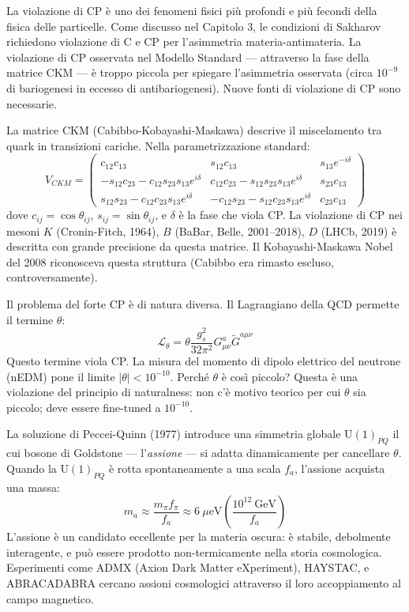 \documentclass[11.5pt,a4paper,openany]{book}
\theoremstyle{remark}
\begin{document}
La violazione di CP è uno dei fenomeni fisici più profondi e più fecondi della fisica delle particelle. Come discusso nel Capitolo 3, le condizioni di Sakharov richiedono violazione di C e CP per l'asimmetria materia-antimateria. La violazione di CP osservata nel Modello Standard --- attraverso la fase della matrice CKM --- è troppo piccola per spiegare l'asimmetria osservata (circa $10^{-9}$ di bariogenesi in eccesso di antibariogenesi). Nuove fonti di violazione di CP sono necessarie.

La matrice CKM (Cabibbo-Kobayashi-Maskawa) descrive il miscelamento tra quark in transizioni cariche. Nella parametrizzazione standard:
\[
V_{CKM} = \begin{pmatrix} c_{12}c_{13} & s_{12}c_{13} & s_{13}e^{-i\delta} \\ -s_{12}c_{23}-c_{12}s_{23}s_{13}e^{i\delta} & c_{12}c_{23}-s_{12}s_{23}s_{13}e^{i\delta} & s_{23}c_{13} \\ s_{12}s_{23}-c_{12}c_{23}s_{13}e^{i\delta} & -c_{12}s_{23}-s_{12}c_{23}s_{13}e^{i\delta} & c_{23}c_{13} \end{pmatrix}
\]
dove $c_{ij} = \cos\theta_{ij}$, $s_{ij} = \sin\theta_{ij}$, e $\delta$ è la fase che viola CP. La violazione di CP nei mesoni $K$ (Cronin-Fitch, 1964), $B$ (BaBar, Belle, 2001--2018), $D$ (LHCb, 2019) è descritta con grande precisione da questa matrice. Il Kobayashi-Maskawa Nobel del 2008 riconosceva questa struttura (Cabibbo era rimasto escluso, controversamente).

Il problema del forte CP è di natura diversa. Il Lagrangiano della QCD permette il termine $\theta$:
\[
\mathcal{L}_\theta = \theta \frac{g_s^2}{32\pi^2} G_{\mu\nu}^a \tilde{G}^{a\mu\nu}
\]
Questo termine viola CP. La misura del momento di dipolo elettrico del neutrone (nEDM) pone il limite $|\theta| < 10^{-10}$. Perché $\theta$ è così piccolo? Questa è una violazione del principio di naturalness: non c'è motivo teorico per cui $\theta$ sia piccolo; deve essere fine-tuned a $10^{-10}$.

La soluzione di Peccei-Quinn (1977) introduce una simmetria globale $\mathrm{U}(1)_{PQ}$ il cui bosone di Goldstone --- l'\textit{assione} --- si adatta dinamicamente per cancellare $\theta$. Quando la $\mathrm{U}(1)_{PQ}$ è rotta spontaneamente a una scala $f_a$, l'assione acquista una massa:
\[
m_a \approx \frac{m_\pi f_\pi}{f_a} \approx 6\ \mu\text{eV} \left(\frac{10^{12}\ \text{GeV}}{f_a}\right)
\]
L'assione è un candidato eccellente per la materia oscura: è stabile, debolmente interagente, e può essere prodotto non-termicamente nella storia cosmologica. Esperimenti come ADMX (Axion Dark Matter eXperiment), HAYSTAC, e ABRACADABRA cercano assioni cosmologici attraverso il loro accoppiamento al campo magnetico.
\end{document}
